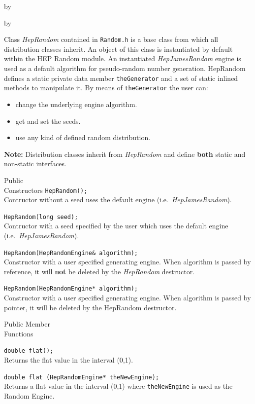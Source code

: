 \documentclass[twoside]{article}
\newcommand{\comp}[1]{\texttt{#1}}%
\newcommand{\entrylabel}[1]{\mbox{\textbf{{#1}}}\hfil}%
\newenvironment{entry}
{\begin{list}{}%
    {\renewcommand{\makelabel}{\entrylabel}%
     \setlength{\labelwidth}{90pt}%
     \setlength{\leftmargin}{\labelwidth}
     \advance\leftmargin by \labelsep%
      }%
    }%
  {\end{list}}
\newcommand{\Entrylabel}[1]%
{\raisebox{0pt}[1ex][0pt]{\makebox[\labelwidth][l]%
    {\parbox[t]{\labelwidth}{\hspace{0pt}\textbf{{#1}}}}}}
\newenvironment{Entry}%
{\renewcommand{\entrylabel}{\Entrylabel}\begin{entry}}%
  {\end{entry}}
\begin{document}
\begin{description}
\begin{Entry}
\begin{Entry}
     Class {\em HepRandom} contained in \comp{Random.h} is a base class
     from which all distribution
     classes inherit.  An object of this class is instantiated by
     default within the HEP Random module.  An instantiated {\em HepJamesRandom}
     engine is used as a default algorithm for pseudo-random number
     generation.  HepRandom defines a static private data member
     \comp{theGenerator} and a set of static inlined methods to
     manipulate it. By means of \comp{theGenerator} the user can:
     \begin{itemize}
        \item change the underlying engine algorithm.
        \item get and set the seeds.
        \item use any kind of defined random distribution.
      \end{itemize}
      {\bf Note:} Distribution classes inherit from {\em HepRandom} and define
      {\bf both} static and non-static interfaces.

\item[Public\\ Constructors]
      \verb+HepRandom();+\\
      Contructor without a seed uses the default engine (i.e.~{\em HepJamesRandom}).

      \verb+HepRandom(long seed);+\\
      Contructor with a seed specified by the user which uses the
      default engine (i.e.~{\em HepJamesRandom}).

      \verb+HepRandom(HepRandomEngine& algorithm);+\\
       Constructor with a user specified generating engine.
       When algorithm is passed by reference, it will {\bf not}
       be deleted by the {\em HepRandom} destructor.

      \verb+HepRandom(HepRandomEngine* algorithm);+\\
      Constructor with a user specified generating engine. When
      algorithm is passed by pointer, it will be deleted by the
      HepRandom destructor.
  
\item[Public Member\\ Functions]

    \verb+double flat();+\\
    Returns the flat value in the interval (0,1).

    \verb+double flat (HepRandomEngine* theNewEngine);+\\
    Returns a flat value in the interval (0,1)
    where \comp{theNewEngine} is used as the Random Engine.


\end{Entry}
\end{Entry}
\end{description}
\end{document}
